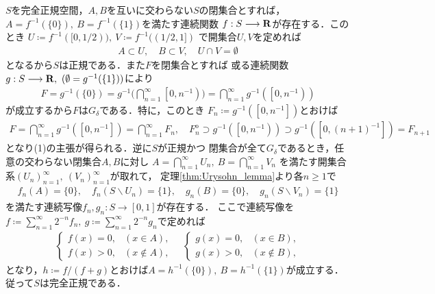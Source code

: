 	\begin{prf}
		$S$を完全正規空間，$A,B$を互いに交わらない$S$の閉集合とすれば，
		$A=f^{-1}(\{0\}),\ B = f^{-1}(\{1\})$を満たす連続関数
		$f:S \longrightarrow \mathbf{R}$が存在する．このとき
		$U \coloneqq f^{-1}([0,1/2)),\ V \coloneqq f^{-1}((1/2,1])$
		で開集合$U,V$を定めれば
		\begin{align}
			A \subset U,\quad B \subset V,\quad U \cap V = \emptyset
		\end{align}
		となるから$S$は正規である．また$F$を閉集合とすれば
		或る連続関数$g:S \longrightarrow \R,\ (\emptyset = g^{-1}(\{1\}))$により
		\begin{align}
			F = g^{-1}(\{0\}) 
			= g^{-1}\Biggl(\bigcap_{n=1}^\infty\left[0,n^{-1}\right)\Biggr)
			= \bigcap_{n=1}^\infty g^{-1}\left(\left[0,n^{-1}\right)\right)
		\end{align}
		が成立するから$F$は$G_\delta$である．特に，このとき
		$F_n \coloneqq g^{-1}\left(\left[0,n^{-1}\right]\right)$とおけば
		\begin{align}
			F = \bigcap_{n=1}^\infty g^{-1}\left(\left[0,n^{-1}\right]\right)
			= \bigcap_{n=1}^\infty F_n,
			\quad F_n^{\mathrm{o}} \supset g^{-1}\left(\left[0,n^{-1}\right)\right)
			\supset g^{-1}\left(\left[0,(n+1)^{-1}\right]\right)
			= F_{n+1}
		\end{align}
		となり(1)の主張が得られる．逆に$S$が正規かつ
		閉集合が全て$G_\delta$であるとき，任意の交わらない閉集合$A,B$に対し
		$A = \bigcap_{n=1}^\infty U_n,\ B = \bigcap_{n=1}^\infty V_n$
		を満たす開集合系$(U_n)_{n=1}^\infty,\ (V_n)_{n=1}^\infty$が取れて，
		定理\ref{thm:Urysohn_lemma}より各$n \geq 1$で
		\begin{align}
			f_n(A) = \{0\},\quad f_n(S \backslash U_n) = \{1\},
			\quad g_n(B) = \{0\},\quad g_n(S \backslash V_n) = \{1\}
		\end{align}
		を満たす連続写像$f_n,g_n:S \longrightarrow [0,1]$が存在する．
		ここで連続写像を$f \coloneqq \sum_{n=1}^\infty 2^{-n} f_n,\ 
		g \coloneqq \sum_{n=1}^\infty 2^{-n} g_n$で定めれば
		\begin{align}
			\begin{cases}
				f(x) = 0, & (x \in A), \\
				f(x) > 0, & (x \notin A),
			\end{cases}
			\quad \begin{cases}
				g(x) = 0, & (x \in B), \\
				g(x) > 0, & (x \notin B),
			\end{cases}
		\end{align}
		となり，$h \coloneqq f/(f+g)$とおけば$A = h^{-1}(\{0\}),\ B = h^{-1}(\{1\})$が成立する．
		従って$S$は完全正規である．
		\QED
	\end{prf}
	

